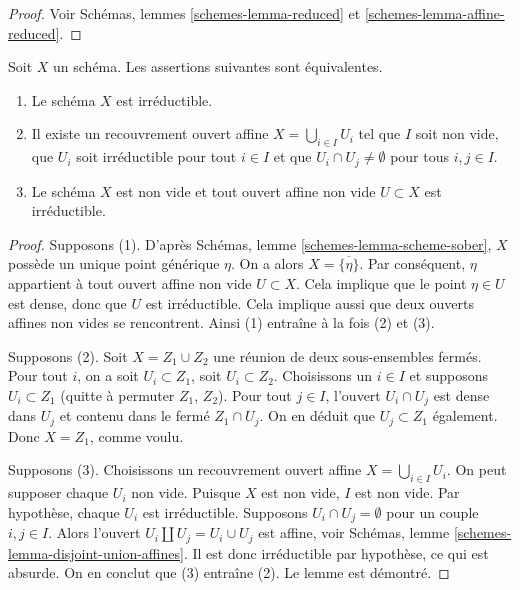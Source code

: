 \begin{proof}
Voir Schémas, lemmes \ref{schemes-lemma-reduced} et
\ref{schemes-lemma-affine-reduced}.
\end{proof}

\begin{lemma}
\label{lemma-characterize-irreducible}
Soit $X$ un schéma. Les
assertions suivantes sont équivalentes.
\begin{enumerate}
\item Le schéma $X$ est irréductible.
\item Il existe un recouvrement ouvert affine $X = \bigcup_{i \in I} U_i$
tel que $I$ soit non vide, que $U_i$ soit irréductible pour tout $i \in I$ et que
$U_i \cap U_j \not = \emptyset$ pour tous $i, j \in I$.
\item Le schéma $X$ est non vide et tout ouvert affine non vide
$U \subset X$ est irréductible.
\end{enumerate}
\end{lemma}

\begin{proof}
Supposons (1). D'après Schémas, lemme \ref{schemes-lemma-scheme-sober},
$X$ possède un unique point générique $\eta$. On a alors
$X = \overline{\{\eta\}}$. Par conséquent, $\eta$ appartient à
tout ouvert affine non vide $U \subset X$. Cela implique que le
point $\eta \in U$ est dense, donc que $U$ est irréductible.
Cela implique aussi que deux ouverts affines non vides se
rencontrent. Ainsi (1) entraîne à la fois (2) et (3).

\medskip\noindent
Supposons (2). Soit $X = Z_1 \cup Z_2$ une réunion de deux sous-ensembles
fermés. Pour tout $i$, on a soit $U_i \subset Z_1$, soit $U_i \subset Z_2$.
Choisissons un $i \in I$ et supposons $U_i \subset Z_1$ (quitte à permuter
$Z_1$, $Z_2$). Pour tout $j \in I$, l'ouvert $U_i \cap U_j$ est dense dans
$U_j$ et contenu dans le fermé $Z_1 \cap U_j$. On en déduit
que $U_j \subset Z_1$ également. Donc $X = Z_1$, comme voulu.

\medskip\noindent
Supposons (3). Choisissons un recouvrement ouvert affine $X = \bigcup_{i \in I} U_i$.
On peut supposer chaque $U_i$ non vide.
Puisque $X$ est non vide, $I$ est non vide.
Par hypothèse, chaque $U_i$ est irréductible.
Supposons $U_i \cap U_j = \emptyset$ pour un couple $i, j \in I$.
Alors l'ouvert $U_i \amalg  U_j = U_i \cup U_j$ est affine, voir
Schémas, lemme \ref{schemes-lemma-disjoint-union-affines}.
Il est donc irréductible par hypothèse, ce qui est absurde. On en conclut que (3)
entraîne (2). Le lemme est démontré.
\end{proof}

